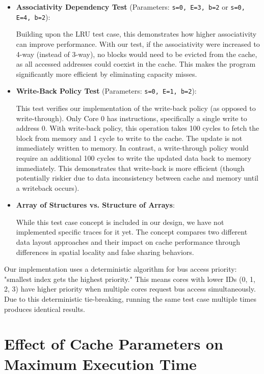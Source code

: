 \documentclass[11pt,a4paper]{article}
\begin{document}
\begin{itemize}[leftmargin=*]
        \item \textbf{Associativity Dependency Test} (Parameters: \texttt{s=0, E=3, b=2} or \texttt{s=0, E=4, b=2}): 
        
        Building upon the LRU test case, this demonstrates how higher associativity can improve performance. With our test, if the associativity were increased to 4-way (instead of 3-way), no blocks would need to be evicted from the cache, as all accessed addresses could coexist in the cache. This makes the program significantly more efficient by eliminating capacity misses.
        
        \item \textbf{Write-Back Policy Test} (Parameters: \texttt{s=0, E=1, b=2}): 
        
        This test verifies our implementation of the write-back policy (as opposed to write-through). Only Core 0 has instructions, specifically a single write to address 0. With write-back policy, this operation takes 100 cycles to fetch the block from memory and 1 cycle to write to the cache. The update is not immediately written to memory. In contrast, a write-through policy would require an additional 100 cycles to write the updated data back to memory immediately. This demonstrates that write-back is more efficient (though potentially riskier due to data inconsistency between cache and memory until a writeback occurs).
        
        \item \textbf{Array of Structures vs. Structure of Arrays}: 
        
        While this test case concept is included in our design, we have not implemented specific traces for it yet. The concept compares two different data layout approaches and their impact on cache performance through differences in spatial locality and false sharing behaviors.
    \end{itemize}

    Our implementation uses a deterministic algorithm for bus access priority: "smallest index gets the highest priority." This means cores with lower IDs (0, 1, 2, 3) have higher priority when multiple cores request bus access simultaneously. Due to this deterministic tie-breaking, running the same test case multiple times produces identical results.

    \section{Effect of Cache Parameters on Maximum Execution Time}
\end{document}
